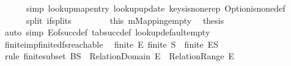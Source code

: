\begin{isabellebody}
\ \ \ \ \ \ simp{\isacharcolon}{\kern0pt}\ lookup{\isacharunderscore}{\kern0pt}map{\isacharunderscore}{\kern0pt}entry{\isacharprime}{\kern0pt}\ lookup{\isacharunderscore}{\kern0pt}update{\isacharprime}{\kern0pt}\ keys{\isacharunderscore}{\kern0pt}is{\isacharunderscore}{\kern0pt}none{\isacharunderscore}{\kern0pt}rep\ Option{\isachardot}{\kern0pt}is{\isacharunderscore}{\kern0pt}none{\isacharunderscore}{\kern0pt}def\isanewline
\ \ \ \ \ \ split{\isacharcolon}{\kern0pt}\ if{\isacharunderscore}{\kern0pt}splits\isanewline
\ \ \ \ {\isacharparenright}{\kern0pt}\isanewline
\ \ \isamarkupfalse%
\ this{\isacharbrackleft}{\kern0pt}\ m{\isacharequal}{\kern0pt}Mapping{\isachardot}{\kern0pt}empty{\isacharbrackright}{\kern0pt}\ \isamarkupfalse%
\ {\isacharquery}{\kern0pt}thesis\isanewline
\ \ \ \ \isamarkupfalse%
\ {\isacharparenleft}{\kern0pt}auto\ simp{\isacharcolon}{\kern0pt}\ E{\isacharunderscore}{\kern0pt}of{\isacharunderscore}{\kern0pt}succ{\isacharunderscore}{\kern0pt}def\ tab{\isacharunderscore}{\kern0pt}succ{\isacharunderscore}{\kern0pt}def\ lookup{\isacharunderscore}{\kern0pt}default{\isacharunderscore}{\kern0pt}empty{\isacharparenright}{\kern0pt}\isanewline
{}\isamarkupfalse%
%
\endisatagproof
{\isafoldproof}%
%
\isadelimproof
\isanewline
%
\endisadelimproof
\isanewline
{}\isamarkupfalse%
\isanewline
\isanewline
{}\isamarkupfalse%
\ finite{\isacharunderscore}{\kern0pt}imp{\isacharunderscore}{\kern0pt}finite{\isacharunderscore}{\kern0pt}dfs{\isacharunderscore}{\kern0pt}reachable{\isacharcolon}{\kern0pt}\isanewline
\ \ {\isachardoublequoteopen}{\isasymlbrakk}finite\ E{\isacharsemicolon}{\kern0pt}\ finite\ S{\isasymrbrakk}\ {\isasymLongrightarrow}\ finite\ {\isacharparenleft}{\kern0pt}E\isactrlsup {\isacharasterisk}{\kern0pt}{\isacharbackquote}{\kern0pt}{\isacharbackquote}{\kern0pt}S{\isacharparenright}{\kern0pt}{\isachardoublequoteclose}\isanewline
%
\isadelimproof
\ \ %
\endisadelimproof
%
\isatagproof
{}\isamarkupfalse%
\ {\isacharparenleft}{\kern0pt}rule\ finite{\isacharunderscore}{\kern0pt}subset{\isacharbrackleft}{\kern0pt}\ B{\isacharequal}{\kern0pt}{\isachardoublequoteopen}S\ {\isasymunion}\ {\isacharparenleft}{\kern0pt}Relation{\isachardot}{\kern0pt}Domain\ E\ {\isasymunion}\ Relation{\isachardot}{\kern0pt}Range\ E{\isacharparenright}{\kern0pt}{\isachardoublequoteclose}{\isacharbrackright}{\kern0pt}{\isacharparenright}{\kern0pt}\isanewline
\ \ \isamarkupfalse%

\end{isabellebody}
